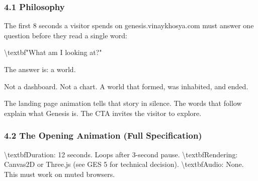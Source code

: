 \documentclass[11pt,a4paper]{article}
\begin{document}
\subsubsection*{4.1 Philosophy}

The first 8 seconds a visitor spends on genesis.vinaykhosya.com must answer one question before they read a single word:

\textbackslash{}textbf{"What am I looking at?"}

The answer is: a world.

Not a dashboard. Not a chart. A world that formed, was inhabited, and ended.

The landing page animation tells that story in silence. The words that follow explain what Genesis is. The CTA invites the visitor to explore.

\subsubsection*{4.2 The Opening Animation (Full Specification)}

\textbackslash{}textbf{Duration:} 12 seconds. Loops after 3-second pause.
\textbackslash{}textbf{Rendering:} Canvas2D or Three.js (see GES 5 for technical decision).
\textbackslash{}textbf{Audio:} None. This must work on muted browsers.
\end{document}
